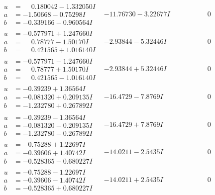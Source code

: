 \documentclass[1p]{elsarticle_modified}
\theoremstyle{definition}
\begin{document}
$$\begin{array}{c|c|c}
\begin{aligned}
u &= \phantom{-}0.180042 - 1.332050 I \\
a &= -1.50668 - 0.75298 I \\
b &= -0.339166 - 0.960564 I\end{aligned}
 & -11.76730 - 3.22677 I & \phantom{-0.000000 } 0 \\ \hline\begin{aligned}
u &= -0.577971 + 1.247660 I \\
a &= \phantom{-}0.78777 - 1.50170 I \\
b &= \phantom{-}0.421565 + 1.016140 I\end{aligned}
 & -2.93844 - 5.32446 I & \phantom{-0.000000 } 0 \\ \hline\begin{aligned}
u &= -0.577971 - 1.247660 I \\
a &= \phantom{-}0.78777 + 1.50170 I \\
b &= \phantom{-}0.421565 - 1.016140 I\end{aligned}
 & -2.93844 + 5.32446 I & \phantom{-0.000000 } 0 \\ \hline\begin{aligned}
u &= -0.39239 + 1.36564 I \\
a &= -0.081320 + 0.209135 I \\
b &= -1.232780 + 0.267892 I\end{aligned}
 & -16.4729 - 7.8769 I & \phantom{-0.000000 } 0 \\ \hline\begin{aligned}
u &= -0.39239 - 1.36564 I \\
a &= -0.081320 - 0.209135 I \\
b &= -1.232780 - 0.267892 I\end{aligned}
 & -16.4729 + 7.8769 I & \phantom{-0.000000 } 0 \\ \hline\begin{aligned}
u &= -0.75288 + 1.22697 I \\
a &= -0.39606 + 1.40742 I \\
b &= -0.528365 - 0.680227 I\end{aligned}
 & -14.0211 - 2.5435 I & \phantom{-0.000000 } 0 \\ \hline\begin{aligned}
u &= -0.75288 - 1.22697 I \\
a &= -0.39606 - 1.40742 I \\
b &= -0.528365 + 0.680227 I\end{aligned}
 & -14.0211 + 2.5435 I & \phantom{-0.000000 } 0 \\ \hline\begin{aligned}

\end{aligned}
\end{array}$$
\end{document}
